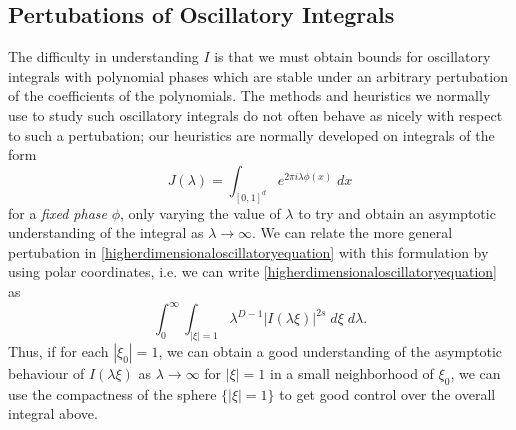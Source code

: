 \documentclass[12pt]{article}
\theoremstyle{definition}
\theoremstyle{remark}
\numberwithin{equation}{section}
\begin{document}
	\subsection{Pertubations of Oscillatory Integrals}

 


The difficulty in understanding $I$ is that we must obtain bounds for oscillatory integrals with polynomial phases which are stable under an arbitrary pertubation of the coefficients of the polynomials. The methods and heuristics we normally use to study such oscillatory integrals do not often behave as nicely with respect to such a pertubation; our heuristics are normally developed on integrals of the form
	\[ J(\lambda) = \int_{[0,1]^d} e^{2 \pi i \lambda \phi(x)}\; dx \]
	for a \emph{fixed phase} $\phi$, only varying the value of $\lambda$ to try and obtain an asymptotic understanding of the integral as $\lambda \to \infty$. We can relate the more general pertubation in \eqref{higherdimensionaloscillatoryequation} with this formulation by using polar coordinates, i.e. we can write \eqref{higherdimensionaloscillatoryequation} as
	\[ \int_0^\infty \int_{|\xi| = 1}  \lambda^{D-1}|I(\lambda \xi)|^{2s}\; d\xi\; d\lambda. \]
	Thus, if for each $|\xi_0| = 1$, we can obtain a good understanding of the asymptotic behaviour of $I(\lambda \xi)$ as $\lambda \to \infty$ for $|\xi| = 1$ in a small neighborhood of $\xi_0$, we can use the compactness of the sphere $\{ |\xi| = 1 \}$ to get good control over the overall integral above.
\end{document}
